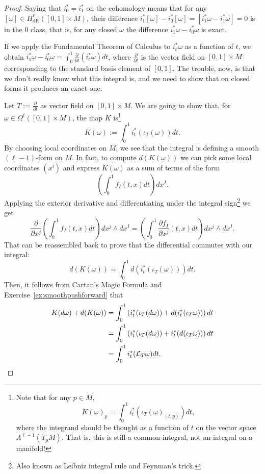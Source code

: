 \begin{proof}
	Saying that  $i_0^* = i_1^*$ on the cohomology means that for any $[\omega]\in H_{\mathrm{dR}}^\ell([0,1]\times M)$, their difference $i_1^*[\omega] - i_0^*[\omega] = [i_1^*\omega - i_1^*\omega] = 0$ is in the $0$ class, that is, for any closed $\omega$ the difference $i_1^*\omega - i_0^*\omega$ is exact.

	If we apply the Fundamental Theorem of Calculus to $i^*_t\omega$ as a function of $t$, we obtain $i_1^*\omega - i_0^*\omega = \int_0^1 \frac{\partial}{\partial t} (i^*_t \omega) dt$,
	where $\frac{\partial}{\partial t}$ is the vector field on $[0,1]\times M$ corresponding to the standard basis element of $[0,1]$.
	The trouble, now, is that we don't really know what this integral is, and we need to show that on closed forms it produces an exact one.

	Let $T:=\frac{\partial}{\partial t}$ as vector field on $[0,1]\times M$.
	We are going to show that, for $\omega\in\Omega^\ell([0,1]\times M)$, the map $K$ is\footnote{Note that for any $p\in M$,
		\begin{equation}
			K(\omega)_p = \int_0^1 i_t^*(\iota_T(\omega)_{(t,p)})dt,
		\end{equation}
		where the integrand should be thought as a function of $t$ on the vector space $\Lambda^{\ell-1}(T_pM)$.
		That is, this is still a common integral, not an integral on a manifold!}
	\begin{equation}
		K(\omega) := \int_0^1 i^*_t(\iota_T(\omega)) dt.
	\end{equation}
	By choosing local coordinates on $M$, we see that the integral is defining a smooth $(\ell-1)$-form on $M$.
	In fact, to compute $d(K(\omega))$ we can pick some local coordinates $(x^i)$ and express $K(\omega)$ as a sum of terms of the form
	\begin{equation}
		\left(\int_0^1 f_I(t,x) dt\right)dx^I.
	\end{equation}
	Applying the exterior derivative and differentiating under the integral sign\footnote{Also known as Leibniz integral rule and Feynman's trick.} we get
	\begin{equation}
		\frac{\partial}{\partial x^j}\left(\int_0^1 f_I(t,x) dt\right)dx^j\wedge dx^I = \left(\int_0^1 \frac{\partial f_I}{\partial x^j}(t,x) dt\right)dx^j\wedge dx^I.
	\end{equation}
	That can be reassembled back to prove that the differential commutes with our integral:
	\begin{equation}
		d(K(\omega)) = \int_0^1 d(i_t^*(\iota_T(\omega)))dt.
	\end{equation}
	Then, it follows from Cartan's Magic Formula and Exercise~\ref{ex:smoothpushforward} that
	\begin{align}
		K(d\omega) + d(K(\omega))
		 & = \int_0^1\left( i_t^*(\iota_T(d\omega)) + d (i_t^*(\iota_T\omega)) \right) dt \\
		 & = \int_0^1\left( i_t^*(\iota_T(d\omega)) + i_t^* (d(\iota_T\omega)) \right) dt \\
		 & = \int_0^1 i_t^*(\mathcal{L}_T\omega) dt.
	\end{align}


\end{proof}
